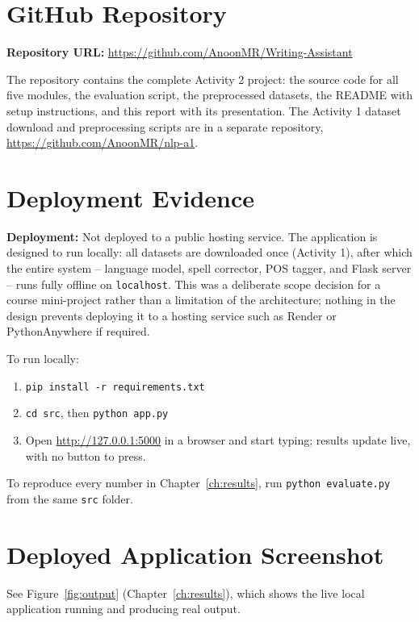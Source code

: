 \documentclass[12pt,a4paper]{report}
\begin{document}
\section{GitHub Repository}

\textbf{Repository URL:}
\url{https://github.com/AnoonMR/Writing-Assistant}

The repository contains the complete Activity 2 project: the source code
for all five modules, the evaluation script, the preprocessed datasets,
the README with setup instructions, and this report with its
presentation. The Activity 1 dataset download and preprocessing scripts
are in a separate repository, \url{https://github.com/AnoonMR/nlp-a1}.

\section{Deployment Evidence}

\textbf{Deployment:} Not deployed to a public hosting service. The
application is designed to run locally: all datasets are downloaded once
(Activity 1), after which the entire system -- language model, spell
corrector, POS tagger, and Flask server -- runs fully offline on
\texttt{localhost}. This was a deliberate scope decision for a course
mini-project rather than a limitation of the architecture; nothing in the
design prevents deploying it to a hosting service such as Render or
PythonAnywhere if required.

To run locally:
\begin{enumerate}
    \item \texttt{pip install -r requirements.txt}
    \item \texttt{cd src}, then \texttt{python app.py}
    \item Open \url{http://127.0.0.1:5000} in a browser and start typing;
    results update live, with no button to press.
\end{enumerate}

To reproduce every number in Chapter~\ref{ch:results}, run
\texttt{python evaluate.py} from the same \texttt{src} folder.

\section{Deployed Application Screenshot}

See Figure~\ref{fig:output} (Chapter~\ref{ch:results}), which shows the
live local application running and producing real output.
\end{document}
